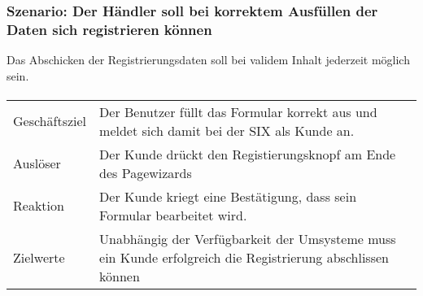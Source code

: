 \subsubsection{Szenario: Der Händler soll bei korrektem Ausfüllen der Daten sich registrieren können}
Das Abschicken der Registrierungsdaten soll bei validem Inhalt jederzeit möglich sein.
\paragraph{}
\begin{tabular}{l|l}
\hline
Geschäftsziel & Der Benutzer füllt das Formular korrekt aus und meldet sich damit bei der SIX als Kunde an. \\
Auslöser & Der Kunde drückt den Registierungsknopf am Ende des Pagewizards \\  \hline
Reaktion & Der Kunde kriegt eine Bestätigung, dass sein Formular bearbeitet wird. \\ \hline
Zielwerte & Unabhängig der Verfügbarkeit der Umsysteme muss ein Kunde erfolgreich die Registrierung abschlissen können
\\ \hline
\end{tabular}


